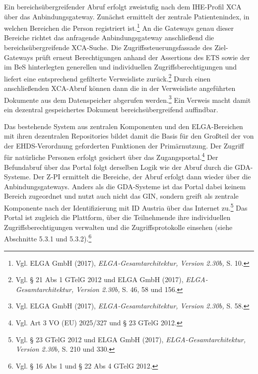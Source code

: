 Ein bereichsübergreifender Abruf erfolgt zweistufig nach dem IHE-Profil XCA über das Anbindungsgateway. Zunächst ermittelt der zentrale Patientenindex, in welchen Bereichen die Person registriert ist.\footnote{Vgl. ELGA GmbH (2017), \textit{ELGA-Gesamtarchitektur, Version 2.30b,} S. 10.} An die Gateways genau dieser Bereiche richtet das anfragende Anbindungsgateway anschließend die bereichsübergreifende XCA-Suche. Die Zugriffssteuerungsfassade des Ziel-Gateways prüft erneut Berechtigungen anhand der Assertions des ETS sowie der im BeS hinterlegten generellen und individuellen Zugriffsberechtigungen und liefert eine entsprechend gefilterte Verweisliste zurück.\footnote{Vgl. § 21 Abs 1 GTelG 2012 und ELGA GmbH (2017), \textit{ELGA-Gesamtarchitektur, Version 2.30b,} S. 46, 58 und 156.} Durch einen anschließenden XCA-Abruf können dann die in der Verweisliste angeführten Dokumente aus dem Datenspeicher abgerufen werden.\footnote{Vgl. ELGA GmbH (2017), \textit{ELGA-Gesamtarchitektur, Version 2.30b,} S. 58.}
Ein Verweis macht damit ein dezentral gespeichertes Dokument bereichsübergreifend auffindbar.


Das bestehende System aus zentralen Komponenten und den ELGA-Bereichen mit ihren dezentralen Repositories bildet damit die Basis für den Großteil der von der EHDS-Verordnung geforderten Funktionen der Primärnutzung. Der Zugriff für natürliche Personen erfolgt gesichert über das Zugangsportal.\footnote{Vgl. Art 3 VO (EU) 2025/327 und § 23 GTelG 2012.}
Der Befundabruf über das Portal folgt derselben Logik wie der Abruf durch die GDA-Systeme. Der Z-PI ermittelt die Bereiche, der Abruf erfolgt dann wieder über die Anbindungsgateways. Anders als die GDA-Systeme ist das Portal dabei keinem Bereich zugeordnet und nutzt auch nicht das GIN, sondern greift als zentrale Komponente nach der Identifizierung mit ID Austria über das Internet zu.\footnote{Vgl. § 23 GTelG 2012 und ELGA GmbH (2017), \textit{ELGA-Gesamtarchitektur, Version 2.30b,} S. 210 und 330.} Das Portal ist zugleich die Plattform, über die Teilnehmende ihre individuellen Zugriffsberechtigungen verwalten und die Zugriffsprotokolle einsehen (siehe Abschnitte 5.3.1 und 5.3.2).\footnote{Vgl. § 16 Abs 1 und § 22 Abs 4 GTelG 2012.}

